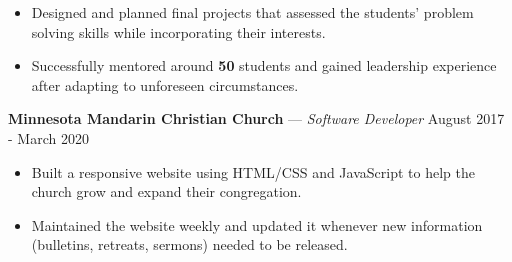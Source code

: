 \documentclass[11pt]{res}
\begin{document}
\begin{footnotesize}
\begin{resume}
\begin{itemize}[leftmargin=6.25mm]
\vspace{1.30mm}
\item Designed and planned final projects that assessed the students' problem solving skills while incorporating their interests.
\vspace{1.30mm}
\item Successfully mentored around \textbf{50} students and gained leadership experience after adapting to unforeseen circumstances. 
\end{itemize}
\vspace{-2.5mm}
\textbf{Minnesota Mandarin Christian Church} — {\sl Software Developer} \hfill August 2017 - March 2020\vspace{-4.5mm}
\begin{itemize}[leftmargin=6.25mm] \itemsep -2pt 
\item Built a responsive website using HTML/CSS and JavaScript to help the church grow and expand their congregation.
\vspace{1.30mm}
\item Maintained the website weekly and updated it whenever new information (bulletins, retreats, sermons) needed to be released. 
\end{itemize}
\vspace{-2mm}
\begin{small}

\end{small}
\end{resume}
\end{footnotesize}
\end{document}
